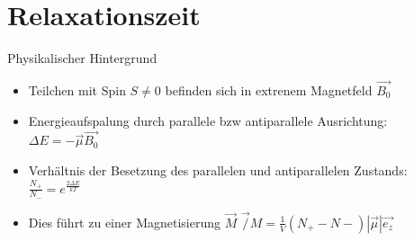 
\thispagestyle{empty}
\frame{\titlepage}


\section{Relaxationszeit}
\begin{frame}{Physikalischer Hintergrund}
	\begin{itemize}
	\item Teilchen mit Spin $S\neq 0$ befinden sich in extrenem Magnetfeld $\vec{B_{0}}$
	\item Energieaufspalung durch parallele bzw antiparallele Ausrichtung:
	$\Delta E = -\vec{\mu}\vec{B_{0}}$
	\item Verhältnis der Besetzung des parallelen und antiparallelen Zustands:
	$\frac{N_{+}}{N_{-}}=e^{\frac{2\Delta E}{kT}}$
	\item Dies führt zu einer Magnetisierung $\vec{M}$
	$\vec/{M}=\frac{1}{V}(N_{+}-N{-})|\vec{\mu}|\vec{e_{z}}$
	\end{itemize}
\end{frame}

